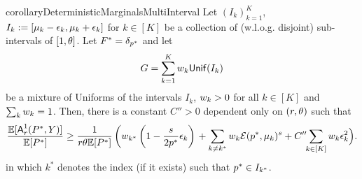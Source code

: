 \begin{restatable}{corollary}{DeterministicMarginalsMultiInterval}\label{cor: [deterministic marginal] multiple interval predictions}
    Let $(I_k)_{k=1}^K$, $I_k:=[\mu_k-\epsilon_k,\mu_k+\epsilon_k]$ for $k\in[K]$ be a collection of (w.l.o.g. disjoint) sub-intervals of $[1,\theta]$. Let $F^*=\delta_{p^*}$ and let
    \[G=\sum_{k=1}^{K}w_k\mbox{\textup{\textsf{Unif}}}(I_k)\]
    be a mixture of Uniforms of the intervals $I_k$, \ie $w_k>0$ for all $k\in[K]$ and $\sum_{k}w_k=1$.
    Then, there is a constant $C''>0$ dependent only on $(r,\theta)$ such that
    \begin{equation}\label{eq: [deterministic marginal/cor multiple interval predictions] bound}
        \frac{\mathbb{E}[\mbox{\textup{\textsf{A}}}^1_r(P^*,Y)]}{\mathbb{E}[P^*]}\ge \frac{1}{r\theta\mathbb{E}[P^*]}\left(w_{k^*}\left(1-\frac{s }{2p^*}\epsilon_k\right)\right.
            + \sum_{k\neq k^*}w_k\mathcal{E}(p^*,\mu_k)^{s}+C''\hspace{-3pt}\sum_{k\in[K]}w_k\epsilon_k^2 \Big).\notag
    \end{equation}
    in which $k^*$ denotes the index (if it exists) such that $p^*\in I_{k^*}$.
\end{restatable}

